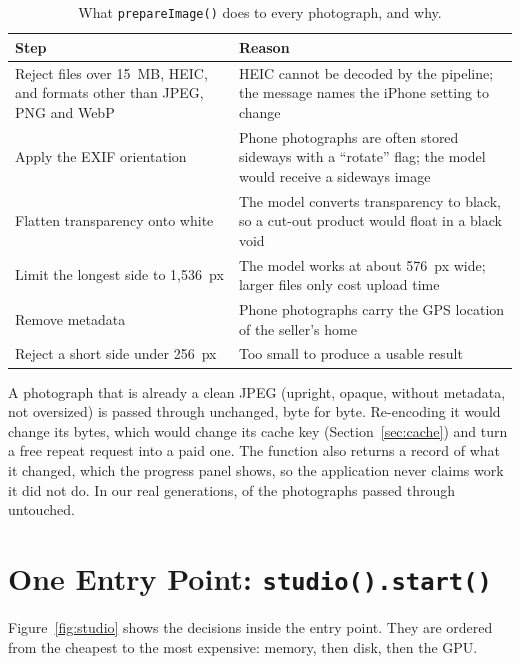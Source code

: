 \begin{table}[!htbp]
\centering
\caption{What \texttt{prepareImage()} does to every photograph, and why.}
\label{tab:prep}
\small
\begin{tabularx}{\linewidth}{@{}L{50mm}Y@{}}
\toprule
\textbf{Step} & \textbf{Reason}\\
\midrule
Reject files over 15~MB, HEIC, and formats other than JPEG, PNG and WebP & HEIC cannot be decoded by the pipeline; the message names the iPhone setting to change\\
Apply the EXIF orientation & Phone photographs are often stored sideways with a ``rotate'' flag; the model would receive a sideways image\\
Flatten transparency onto white & The model converts transparency to black, so a cut-out product would float in a black void\\
Limit the longest side to 1{,}536~px & The model works at about 576~px wide; larger files only cost upload time\\
Remove metadata & Phone photographs carry the GPS location of the seller's home\\
Reject a short side under 256~px & Too small to produce a usable result\\
\bottomrule
\end{tabularx}
\end{table}

A photograph that is already a clean JPEG (upright, opaque, without metadata, not oversized) is passed through unchanged, byte for byte. Re-encoding it would change its bytes, which would change its cache key (Section~\ref{sec:cache}) and turn a free repeat request into a paid one. The function also returns a record of what it changed, which the progress panel shows, so the application never claims work it did not do. In our \vNRuns{} real generations, \vNPrepUntouched{} of the \vNPrepPhotos{} photographs passed through untouched.

\section{One Entry Point: \texttt{studio().start()}}
\label{sec:studio}

Figure~\ref{fig:studio} shows the decisions inside the entry point. They are ordered from the cheapest to the most expensive: memory, then disk, then the GPU.

